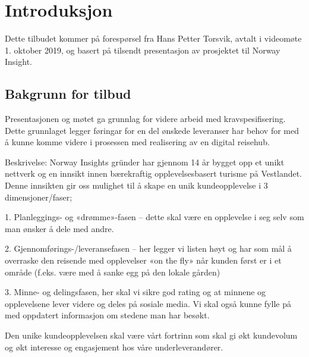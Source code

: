 \section{Introduksjon}
Dette tilbudet kommer på forespørsel fra Hans Petter Torsvik, avtalt i videomøte 1. oktober 2019, og basert på tilsendt presentasjon av prosjektet til Norway Insight.

\subsection{Bakgrunn for tilbud}
Presentasjonen og møtet ga grunnlag for videre arbeid med kravspesifisering. Dette grunnlaget legger føringar for en del ønskede leveranser \customername har behov for med å kunne komme videre i prosessen med realisering av en digital reisehub. 

Beskrivelse: \break
Norway Insights gründer har gjennom 14 år bygget opp et unikt nettverk og en innsikt innen bærekraftig opplevelsesbasert turisme på Vestlandet. Denne innsikten gir oss mulighet til å skape en unik kundeopplevelse i 3 dimensjoner/faser;

1.     Planleggings- og «drømme»-fasen – dette skal være en opplevelse i seg selv som man ønsker å dele med andre.

2.     Gjennomførings-/leveransefasen – her legger vi listen høyt og har som mål å overraske den reisende med opplevelser «on the fly» når kunden først er i et område (f.eks. være med å sanke egg på den lokale gården)

3.     Minne- og delingsfasen, her skal vi sikre god rating og at minnene og opplevelsene lever videre og deles på sosiale media. Vi skal også kunne fylle på med oppdatert informasjon om stedene man har besøkt.

Den unike kundeopplevelsen skal være vårt fortrinn som skal gi økt kundevolum og økt interesse og engasjement hos våre underleverandører.